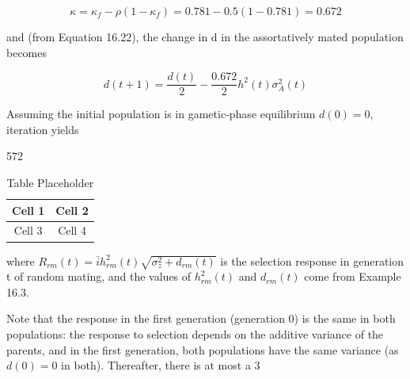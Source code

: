 \documentclass{article}
\begin{document}
\begin{equation}
\kappa=\kappa_{f}-\rho(1-\kappa_{f})=0.781-0.5(1-0.781)=0.672
\end{equation}

and (from Equation 16.22), the change in d in the assortatively mated population becomes

\begin{equation}
d(t+1)=\frac{d(t)}{2}-\frac{0.672}{2}h^{2}(t)\sigma_{A}^{2}(t)
\end{equation}

Assuming the initial population is in gametic-phase equilibrium  $ d(0) = 0 $, iteration yields

572

\begin{table}[h]
\centering
\begin{tabular}{|c|c|}
\hline
Cell 1 & Cell 2 \\
\hline
Cell 3 & Cell 4 \\
\hline
\end{tabular}
\caption{Table Placeholder}
\end{table}

where  $ R_{rm}(t) = \bar{i} h_{rm}^2(t) \sqrt{\sigma_z^2 + d_{rm}(t)} $ is the selection response in generation t of random mating, and the values of  $ h_{rm}^2(t) $ and  $ d_{rm}(t) $ come from Example 16.3.

Note that the response in the first generation (generation 0) is the same in both populations: the response to selection depends on the additive variance of the parents, and in the first generation, both populations have the same variance (as  $ d(0) = 0 $ in both). Thereafter, there is at most a 3%
\end{document}
